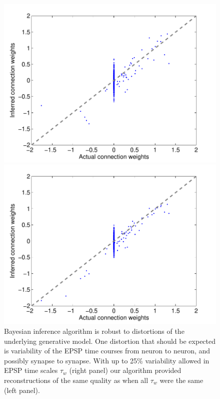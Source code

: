 %
%
\begin{figure}[h]
\centering
\begin{minipage}[c]{0.45\hsize}
\includegraphics[width=\hsize]{../figs/FigureA9_all_same_sol}
\end{minipage}
\begin{minipage}[c]{0.45\hsize}
\includegraphics[width=\hsize]{../figs/FigureA9_variable_25}
\end{minipage}
\caption{Bayesian inference algorithm is robust to distortions of the
underlying generative model. One distortion that should be expected is variability of the EPSP time courses from neuron to neuron, and possibly synapse to synapse. 
With up to 25\% variability allowed in EPSP time scales $\tau_w$ (right panel) our algorithm provided reconstructions of the same quality as when all $\tau_w$ were the same (left panel).}
\label{fig:vartau}
\end{figure}

